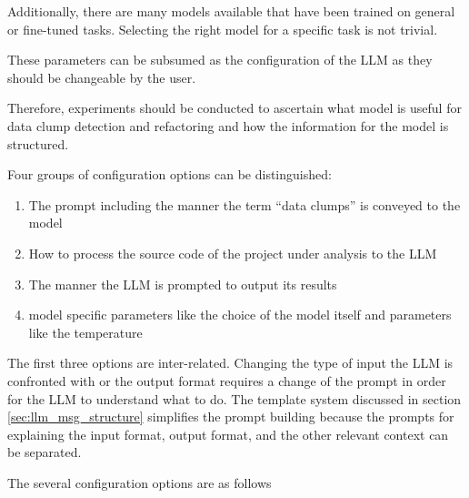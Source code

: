 Additionally, there are many models available that have been trained on general or fine-tuned  tasks. Selecting the right model for a specific task is not trivial. 

These parameters can be subsumed as the configuration of the \ac{LLM} as they should be changeable by the user. 

Therefore, experiments should be conducted to ascertain what model is useful for data clump detection and refactoring and how the information for the model is structured.  

Four groups of configuration options can be distinguished:
\begin{enumerate}
    \item The prompt including the manner the term \enquote{data clumps} is conveyed to the model
    \item How to process the source code of the project under analysis to the \ac{LLM}
    \item The manner the LLM is prompted to output its results
    \item model specific parameters like the choice of the model itself and parameters like the temperature
\end{enumerate}

The first three options are inter-related. Changing the type of input the LLM is confronted with or the output format requires a change of the prompt in order for the LLM to understand what to do. The template system discussed in section \ref{sec:llm_msg_structure} simplifies the prompt building because the prompts for explaining the input format, output format, and the other relevant context can be separated.

The several configuration options are as follows















\begin{comment}
In this section, the results of some of these experiments will be discussed.  As repeatedly noted, these experiments are not always reproducible and therefore are only to some extent helpful. In all cases, ChatGPT is asked to output in \ac{JSON} to have a consistent format.

In each experiment, different parameters of the input are adjusted. Each these parameters has an influence of the quality of the output:

\begin{itemize}
    \item Instruction
    \item Model
    \item Data format
    \item Data size
    \item Temperature
\end{itemize}
\end{comment}
